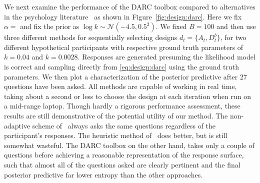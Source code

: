 We next examine the performance of the DARC toolbox compared to alternatives in the
psychology literature~\citep{Kirby:2009eu,Frye:2016eu} as shown in Figure~\ref{fig:design:darc}.  Here
we fix $\alpha=$ and fix the prior as $\log k \sim \mathcal{N}(-4.5,0.5^2)$.  We fixed $B=100$ and
then use three different methods for sequentially selecting designs $d_t = \{A_t,D^b_t\}$, for
two different hypothetical participants with respective ground truth parameters of $k=0.04$ and $k=0.0028$.
Responses are generated presuming the likelihood model is correct and sampling directly from
\eqref{eq:design:darc} using the ground truth parameters.  We then plot a characterization of the posterior
predictive after $27$ questions have been asked.  All methods are capable of working in real time, taking
about a second or less to choose the design at each iteration when run on a mid-range laptop.  Though 
hardly a rigorous performance assessment, these results are still demonstrative of the potential utility of our
method.  The non-adaptive scheme of~\cite{Kirby:2009eu} always asks the same questions regardless of
the participant's responses.  The heuristic method of~\cite{Frye:2016eu} does better, but is still somewhat
wasteful.  The DARC toolbox on the other hand, takes only a couple of questions before achieving a
reasonable representation of the response surface, such that almost all of the questions asked are clearly
pertinent and the final posterior predictive far lower entropy than the other approaches.